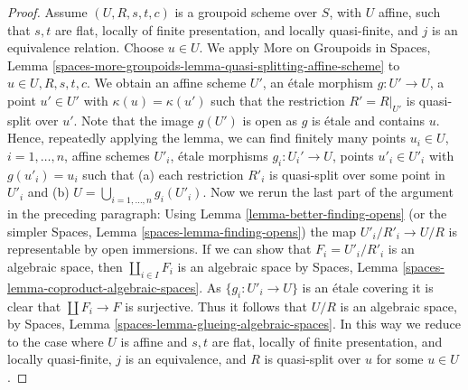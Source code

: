 \begin{proof}
\medskip\noindent
Assume $(U, R, s, t, c)$ is a groupoid scheme over $S$,
with $U$ affine, such that $s, t$ are flat, locally of finite presentation,
and locally quasi-finite, and $j$ is an equivalence relation.
Choose $u \in U$. We apply
More on Groupoids in Spaces,
Lemma \ref{spaces-more-groupoids-lemma-quasi-splitting-affine-scheme}
to $u \in U, R, s, t, c$. We obtain an affine scheme $U'$, an \'etale
morphism $g : U' \to U$, a point $u' \in U'$ with $\kappa(u) = \kappa(u')$
such that the restriction $R' = R|_{U'}$ is quasi-split over $u'$.
Note that the image $g(U')$ is open as $g$ is \'etale and contains $u$.
Hence, repeatedly applying the lemma, we can find finitely many
points $u_i \in U$, $i = 1, \ldots, n$,
affine schemes $U'_i$, \'etale morphisms $g_i : U_i' \to U$, points
$u'_i \in U'_i$ with $g(u'_i) = u_i$ such that (a) each
restriction $R'_i$ is quasi-split over some point in $U'_i$ and
(b) $U = \bigcup_{i = 1, \ldots, n} g_i(U'_i)$.
Now we rerun the last part of the argument in the preceding paragraph:
Using
Lemma \ref{lemma-better-finding-opens}
(or the simpler
Spaces, Lemma \ref{spaces-lemma-finding-opens})
the map $U'_i/R'_i \to U/R$ is representable by open immersions.
If we can show that $F_i = U'_i/R'_i$ is an algebraic space, then
$\coprod_{i \in I} F_i$ is an algebraic space by
Spaces, Lemma \ref{spaces-lemma-coproduct-algebraic-spaces}.
As $\{g_i : U'_i \to U\}$ is an \'etale covering
it is clear that $\coprod F_i \to F$ is surjective. Thus
it follows that $U/R$ is an algebraic space, by
Spaces, Lemma \ref{spaces-lemma-glueing-algebraic-spaces}.
In this way we reduce to the case where $U$ is affine and $s, t$ are flat,
locally of finite presentation, and locally quasi-finite,
$j$ is an equivalence, and $R$ is quasi-split over $u$ for some
$u \in U$.


\end{proof}

